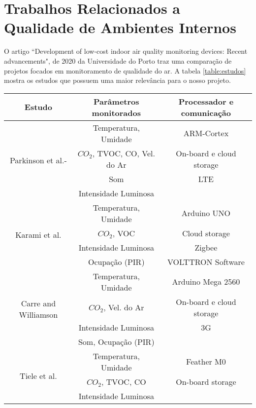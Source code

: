 \documentclass[../monografia.tex]{subfiles}
\begin{document}
\section{Trabalhos Relacionados a Qualidade de Ambientes Internos} 

O artigo ``Development of low-cost indoor air quality monitoring devices:
Recent advancements", de 2020 da Universidade do Porto \cite{IAQ_Compare} traz uma comparação de projetos focados em monitoramento de qualidade do ar. A tabela \ref{table:estudos} mostra os estudos que possuem uma maior relevância para o nosso projeto. 

\begin{center}
\begin{longtable}{ c c c } 
\toprule
\textbf{Estudo} & \textbf{Parâmetros monitorados} & \textbf{Processador e comunicação} \\ 

\hline %
\multirow{4}{8em}{Parkinson et al.\cite{PARKINSON201915}-\cite{PARKINSON2019241}} & Temperatura, Umidade & ARM-Cortex \\
& $CO_{2}$, TVOC, CO, Vel. do Ar & On-board e cloud storage \\ 
& Som & LTE \\ 
& Intensidade Luminosa  &  \\ 

\hline %
\multirow{4}{8em}{Karami et al.\cite{KARAMI2018412}} & Temperatura, Umidade & Arduino UNO \\ 
& $CO_{2}$, VOC & Cloud storage \\ 
& Intensidade Luminosa & Zigbee \\ 
& Ocupação (PIR)  & VOLTTRON Software \\ 

\hline %
\multirow{4}{8em}{Carre and Williamson\cite{CARRE20181751}} & Temperatura, Umidade & Arduino Mega 2560 \\ 
& $CO_{2}$, Vel. do Ar & On-board e cloud storage \\ 
& Intensidade Luminosa & 3G \\ 
& Som, Ocupação (PIR)  &  \\ 

\hline %
\multirow{3}{8em}{Tiele et al.\cite{Tiele2018}} & Temperatura, Umidade & Feather M0 \\ 
& $CO_{2}$, TVOC, CO & On-board storage \\ 
& Intensidade Luminosa &  \\ 


\end{longtable}
\end{center}
\end{document}
